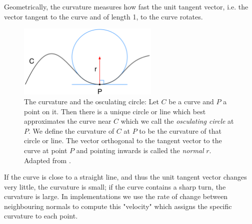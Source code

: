 
Geometrically, the curvature measures how fast the unit tangent vector, i.e. the vector tangent to the curve and of length 1,  to the curve rotates. 

\begin{figure}[H]
	\centering
	\includegraphics[width=0.6\textwidth]{../Figures/curveCircle.png}
	\caption{The curvature and the osculating circle: Let \( C \) be a curve and \( P \) a point on it. Then there is a unique circle or line which best approximates the curve near \( C \) which we call the \textit{osculating circle} at \( P \). We define the curvature of \( C \) at \( P \) to be the curvature of that circle or line. The vector orthogonal to the tangent vector to the curve at point \( P \) and pointing inwards is called the \textit{normal} \(r\). Adapted from \cite{osculatingCircle}.
		}
	\label{fig:curveCircle}
\end{figure}

If the curve is close to a straight line, and thus the unit tangent vector changes very little, the curvature is small; if the curve contains a sharp turn, the curvature is large.
In implementations we use the rate of change between neighbouring normals to compute this "velocity" which assigns the specific curvature to each point.



